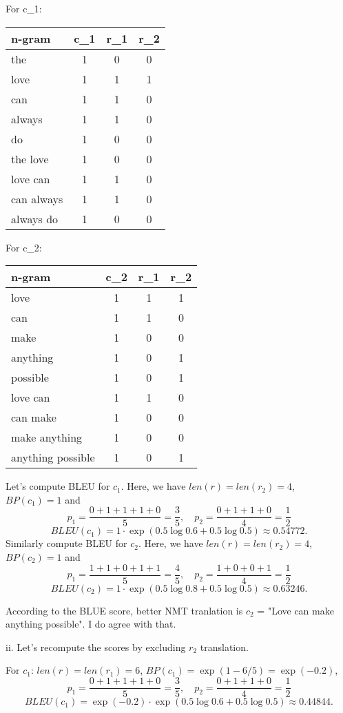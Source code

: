 \documentclass[12pt]{article}
\begin{document}
\noindent For c_1:
\begin{tabular}{l|c|c|c|}
n-gram & c_1 & r_1 & r_2 \\
\hline
the & 1 & 0 & 0 \\
love & 1 & 1 & 1 \\
can & 1 & 1 & 0 \\
always & 1 & 1 & 0 \\
do & 1 & 0 & 0 \\
\hline
the love & 1 & 0 & 0 \\
love can & 1 & 1 & 0 \\
can always & 1 & 1 & 0 \\
always do & 1 & 0 & 0 \\
\hline
\end{tabular}
\quad
For c_2:
\begin{tabular}{l|c|c|c|}
n-gram & c_2 & r_1 & r_2 \\
\hline
love & 1 & 1 & 1 \\
can & 1 & 1 & 0 \\
make & 1 & 0 & 0 \\
anything & 1 & 0 & 1 \\
possible & 1 & 0 & 1 \\
\hline
love can & 1 & 1 & 0 \\
can make & 1 & 0 & 0 \\
make anything & 1 & 0 & 0 \\
anything possible & 1 & 0 & 1 \\
\hline
\end{tabular}
\smallskip

Let's compute BLEU for $c_1$. Here, we have $len(r) = len(r_2) = 4$, $BP(c_1) = 1$ and
$$
p_1 = \frac{0 + 1 + 1 + 1 + 0}{5} = \frac{3}{5}, \quad p_2 = \frac{0 + 1 + 1 + 0}{4} = \frac{1}{2}
$$
$$
BLEU(c_1) = 1 \cdot \exp(0.5 \log 0.6 + 0.5 \log 0.5) \approx 0.54772.
$$
Similarly compute BLEU for $c_2$. Here, we have $len(r) = len(r_2) = 4$, $BP(c_2) = 1$ and
$$
p_1 = \frac{1 + 1 + 0 + 1 + 1}{5} = \frac{4}{5}, \quad p_2 = \frac{1 + 0 + 0 + 1}{4} = \frac{1}{2}
$$
$$
BLEU(c_2) = 1 \cdot \exp(0.5 \log 0.8 + 0.5 \log 0.5) \approx 0.63246.
$$

According to the BLUE score, better NMT tranlation is $c_2$ = "Love can make anything possible". I do agree with that.

ii. Let's recompute the scores by excluding $r_2$ translation.

For $c_1$: $len(r) = len(r_1) = 6$, $BP(c_1) = \exp(1 - 6/5) = \exp(-0.2)$,
$$
p_1 = \frac{0 + 1 + 1 + 1 + 0}{5} = \frac{3}{5}, \quad p_2 = \frac{0 + 1 + 1 + 0}{4} = \frac{1}{2}
$$
$$
BLEU(c_1) = \exp(-0.2) \cdot \exp(0.5 \log 0.6 + 0.5 \log 0.5) \approx 0.44844.
$$
\end{document}
